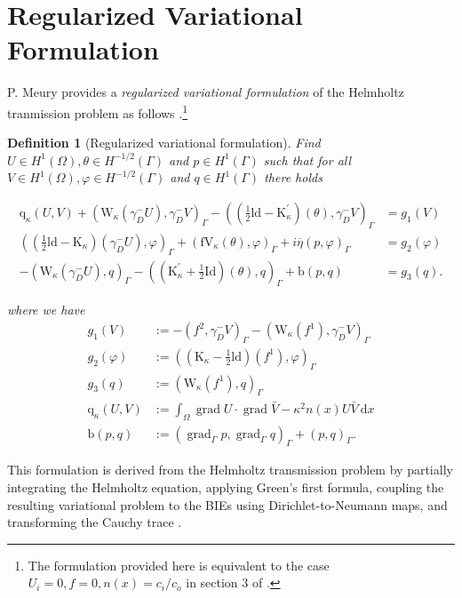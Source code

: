 \documentclass[12pt,journal,compsoc, onecolumn]{IEEEtran}
\newtheorem{definition}[theorem]{Definition}
\begin{document}
\section{Regularized Variational Formulation}
\label{section:regularized_variational_formulation}

P. Meury provides a \textit{regularized variational formulation} of the Helmholtz tranmission problem as follows \cite{meury2007stable}.\footnote{The formulation provided here is equivalent to the case 
 $U_i = 0, f = 0, n(x) = c_i / c_o$ in section 3 of \cite{meury2007stable}.}
\begin{definition}[Regularized variational formulation]
    Find \(U \in H^{1}(\Omega), \theta \in H^{-1 / 2}(\Gamma)\) and \(p \in H^{1}(\Gamma)\) such that for all \(V \in H^{1}(\Omega), \varphi \in H^{-1 / 2}(\Gamma)\)
    and \(q \in H^{1}(\Gamma)\) there holds

    \begin{align}
        \mathrm{q}_{\kappa}(U, V)+\left(\mathrm{W}_{\kappa}\left(\gamma_{D}^{-} U\right), \gamma_{D}^{-} V\right)_{\Gamma}-\left((\frac{1}{2} \mathrm{ld}-\mathrm{K}_{\kappa}^{\prime})(\theta), \gamma_{D}^{-} V\right)_{\Gamma} &=g_1(V) \nonumber\\
        \left((\frac{1}{2} \mathrm{ld}-\mathrm{K}_{\kappa})\left(\gamma_{D}^{-} U\right), \varphi\right)_{\Gamma}+\left(\mathrm{fV}_{\kappa}(\theta), \varphi\right)_{\Gamma}+i \overline{\eta}(p, \varphi)_{\Gamma} &={g_2(\varphi)} \label{eq:variational_formulation}\\
        -\left(\mathrm{W}_{\kappa}\left(\gamma_{D}^{-} U\right), q\right)_{\Gamma}-\left((\mathrm{K}_{\kappa}^{\prime}+\frac{1}{2} \mathrm{Id})(\theta), q\right)_{\Gamma}+\mathrm{b}(p, q) &=g_3(q). \nonumber
    \end{align}

    where we have 
    $$
    \begin{aligned} 
        g_1(V) &:=-\left(f^2, \gamma_{D}^{-} V\right)_{\Gamma}-\left(\mathrm{W}_{\kappa}\left(f^1\right), \gamma_{D}^{-} V\right)_{\Gamma} \\ 
        g_2(\varphi) &:=\left(\left(\mathrm{K}_{\kappa}-\frac{1}{2} \mathrm{ld}\right)\left(f^1\right), \varphi\right)_{\Gamma} \\ 
        g_3(q) &:=\left(\mathrm{W}_{\kappa}\left(f^1\right), q\right)_{\Gamma} \\ 
        \mathrm{q}_{\kappa}(U, V)& :=\int_{\Omega} \operatorname{grad} U \cdot \operatorname{grad} \bar{V}-\kappa^{2} n({x}) U \bar{V} \mathrm{~d} {x} \\
        \mathrm{b}(p, q)& :=\left(\operatorname{grad}_{\Gamma} p, \operatorname{grad}_{\Gamma} q\right)_{\Gamma}+(p, q)_{\Gamma}.
    \end{aligned}
    $$

\end{definition}  \noindent
This formulation is derived from the Helmholtz transmission problem by partially integrating the Helmholtz equation, 
applying Green's first formula, coupling the resulting variational problem to 
the BIEs using Dirichlet-to-Neumann maps, and transforming the Cauchy trace \cite{meury2007stable}. 
\end{document}
